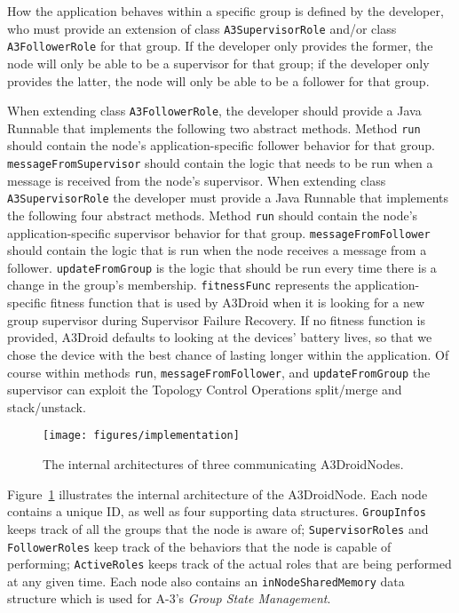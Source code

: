 How the application behaves within a specific group is defined by the developer, who must provide an extension of class \texttt{A3SupervisorRole} and/or class \texttt{A3FollowerRole} for that group. If the developer only provides the former, the node will only be able to be a supervisor for that group; if the developer only provides the latter, the node will only be able to be a follower for that group.


When extending class \texttt{A3FollowerRole}, the developer should provide a Java Runnable that implements the following two abstract methods. Method \texttt{run} should contain the node's application-specific follower behavior for that group. \texttt{messageFromSupervisor} should contain the logic that needs to be run when a message is received from the node's supervisor. When extending class \texttt{A3SupervisorRole} the developer must provide a Java Runnable that implements the following four abstract methods. Method \texttt{run} should contain the node's application-specific supervisor behavior for that group. \texttt{messageFromFollower} should contain the logic that is run when the node receives a message from a follower. \texttt{updateFromGroup} is the logic that should be run every time there is a change in the group's membership. \texttt{fitnessFunc} represents the application-specific fitness function that is used by A3Droid when it is looking for a new group supervisor during Supervisor Failure Recovery. If no fitness function is provided, A3Droid defaults to looking at the devices' battery lives, so that we chose the device with the best chance of lasting longer within the application. Of course within methods \texttt{run}, \texttt{messageFromFollower}, and \texttt{updateFromGroup} the supervisor can exploit the Topology Control Operations split/merge and stack/unstack. 

\begin{figure}[h!]
\centering
\texttt{[image: figures/implementation]}
\caption{The internal architectures of three communicating A3DroidNodes.}
\label{fig:implementation}
\end{figure}

Figure~\ref{fig:implementation} illustrates the internal architecture of the A3DroidNode. Each node contains a unique ID, as well as four supporting data structures. \texttt{GroupInfos} keeps track of all the groups that the node is aware of; \texttt{SupervisorRoles} and \texttt{FollowerRoles} keep track of the behaviors that the node is capable of performing; \texttt{ActiveRoles} keeps track of the actual roles that are being performed at any given time. Each node also contains an \texttt{inNodeSharedMemory} data structure which is used for A-3's \emph{Group State Management}.

